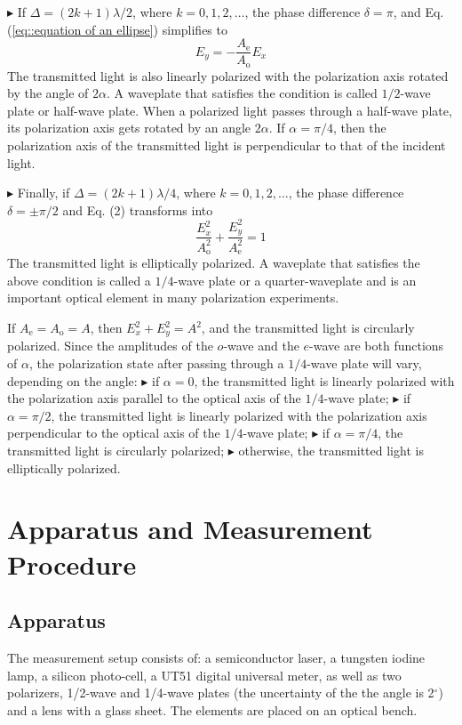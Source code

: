 \documentclass[a4paper]{article}
\begin{document}
$\blacktriangleright$ If $\Delta=(2 k+1) \lambda / 2$, where $k=0,1,2, \ldots$, the phase difference $\delta=\pi$, and Eq.(\ref{eq::equation of an ellipse})
simplifies to
$$
	E_{y}=-\frac{A_{\mathrm{e}}}{A_{\mathrm{o}}} E_{x}
$$
The transmitted light is also linearly polarized with the polarization axis rotated by the angle of $2 \alpha$. A waveplate that satisfies the condition is called
$1 / 2$-wave plate or half-wave plate. When a polarized light passes through a half-wave plate, its polarization axis gets rotated by an angle $2 \alpha$. If
$\alpha=\pi / 4$, then the polarization axis of the transmitted light is perpendicular to that of the incident light.

$\blacktriangleright$ Finally, if $\Delta=(2 k+1) \lambda / 4$, where $k=0,1,2, \ldots$, the phase difference $\delta=\pm \pi / 2$ and Eq. (2) transforms into
$$
	\frac{E_{x}^{2}}{A_{\mathrm{o}}^{2}}+\frac{E_{y}^{2}}{A_{\mathrm{e}}^{2}}=1
$$
The transmitted light is elliptically polarized. A waveplate that satisfies the above condition is called a $1 / 4$-wave plate or a quarter-waveplate and is an
important optical element in many polarization experiments.

If $A_{\mathrm{e}}=A_{\mathrm{o}}=A$, then $E_{x}^{2}+E_{y}^{2}=A^{2}$, and the transmitted light is circularly polarized. Since the amplitudes of the
$o$-wave and the $e$-wave are both functions of $\alpha$, the polarization state after passing through a $1 / 4$-wave plate will vary, depending on the angle:
$\blacktriangleright$ if $\alpha=0$, the transmitted light is linearly polarized with the polarization axis parallel to the optical axis of the $1 / 4$-wave plate;
$\blacktriangleright$ if $\alpha=\pi / 2$, the transmitted light is linearly polarized with the polarization axis perpendicular to the optical axis of the $1 / 4$-wave plate;
$\blacktriangleright$ if $\alpha=\pi / 4$, the transmitted light is circularly polarized;
$\blacktriangleright$ otherwise, the transmitted light is elliptically polarized.

\section{Apparatus and Measurement Procedure}

\subsection{Apparatus}
The measurement setup consists of: a semiconductor laser, a tungsten iodine lamp,
a silicon photo-cell, a UT51 digital universal meter, as well as two polarizers, 1/2-wave
and 1/4-wave plates (the uncertainty of the the angle is 2$^\circ$) and a lens with a glass sheet.
The elements are placed on an optical bench.
\end{document}

